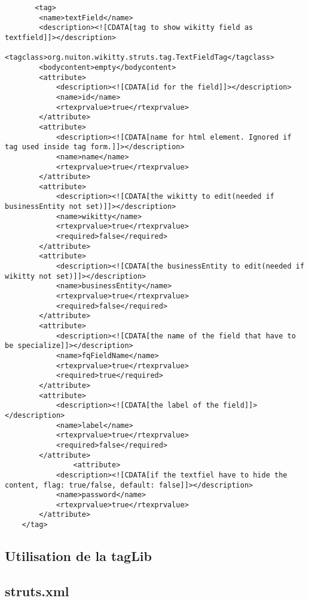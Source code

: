 \begin{lstlisting}
       <tag>
        <name>textField</name>
        <description><![CDATA[tag to show wikitty field as textfield]]></description>        
        <tagclass>org.nuiton.wikitty.struts.tag.TextFieldTag</tagclass>
        <bodycontent>empty</bodycontent>
        <attribute>
            <description><![CDATA[id for the field]]></description>
            <name>id</name>
            <rtexprvalue>true</rtexprvalue>
        </attribute>
        <attribute>
            <description><![CDATA[name for html element. Ignored if tag used inside tag form.]]></description>
            <name>name</name>
            <rtexprvalue>true</rtexprvalue>
        </attribute>
        <attribute>
            <description><![CDATA[the wikitty to edit(needed if businessEntity not set)]]></description>
            <name>wikitty</name>
            <rtexprvalue>true</rtexprvalue>
            <required>false</required>
        </attribute>
        <attribute>
            <description><![CDATA[the businessEntity to edit(needed if wikitty not set)]]></description>
            <name>businessEntity</name>
            <rtexprvalue>true</rtexprvalue>
            <required>false</required>
        </attribute>
        <attribute>
            <description><![CDATA[the name of the field that have to be specialize]]></description>
            <name>fqFieldName</name>
            <rtexprvalue>true</rtexprvalue>
            <required>true</required>
        </attribute>
        <attribute>
            <description><![CDATA[the label of the field]]></description>
            <name>label</name>
            <rtexprvalue>true</rtexprvalue>
            <required>false</required>
        </attribute>
                <attribute>
            <description><![CDATA[if the textfiel have to hide the content, flag: true/false, default: false]]></description>
            <name>password</name>
            <rtexprvalue>true</rtexprvalue>
        </attribute>
    </tag>
\end{lstlisting}




\subsection*{Utilisation de la tagLib}


\subsection*{struts.xml}

